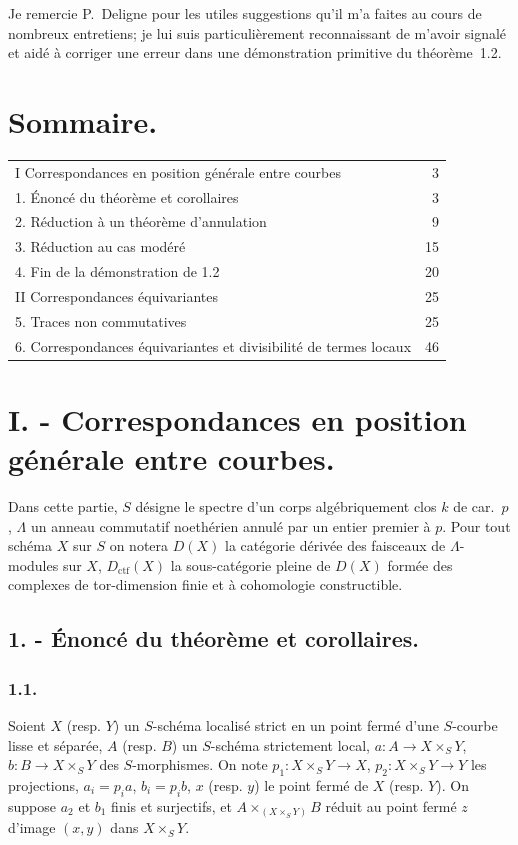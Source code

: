 \documentclass[11pt]{article}
\providecommand{\ctf}{\mathrm{ctf}}
\begin{document}
Je remercie P.~Deligne pour les utiles suggestions qu'il m'a faites au cours de nombreux entretiens; je lui suis particulièrement reconnaissant de m'avoir signalé et aidé à corriger une erreur dans une démonstration primitive du théorème~1.2.

\section*{Sommaire.}
\begin{tabular}{@{}p{}r@{}}
I Correspondances en position générale entre courbes & 3\\
1. Énoncé du théorème et corollaires & 3\\
2. Réduction à un théorème d'annulation & 9\\
3. Réduction au cas modéré & 15\\
4. Fin de la démonstration de 1.2 & 20\\
II Correspondances équivariantes & 25\\
5. Traces non commutatives & 25\\
6. Correspondances équivariantes et divisibilité de termes locaux & 46
\end{tabular}

\section*{I. - Correspondances en position générale entre courbes.}

Dans cette partie, $S$ désigne le spectre d'un corps algébriquement clos $k$ de car.~$p$, $\Lambda$ un anneau commutatif noethérien annulé par un entier premier à $p$. Pour tout schéma $X$ sur $S$ on notera $D(X)$ la catégorie dérivée des faisceaux de $\Lambda$-modules sur $X$, $D_{\ctf}(X)$ la sous-catégorie pleine de $D(X)$ formée des complexes de tor-dimension finie et à cohomologie constructible.

\subsection*{1. - Énoncé du théorème et corollaires.}

\subsubsection*{1.1.}
Soient $X$ (resp. $Y$) un $S$-schéma localisé strict en un point fermé d'une $S$-courbe lisse et séparée, $A$ (resp. $B$) un $S$-schéma strictement local, $a:A\longrightarrow X\times_S Y$, $b:B\longrightarrow X\times_S Y$ des $S$-morphismes. On note $p_1:X\times_S Y\to X$, $p_2:X\times_S Y\to Y$ les projections, $a_i=p_i a$, $b_i=p_i b$, $x$ (resp. $y$) le point fermé de $X$ (resp. $Y$). On suppose $a_2$ et $b_1$ finis et surjectifs, et $A\times_{(X\times_S Y)}B$ réduit au point fermé $z$ d'image $(x,y)$ dans $X\times_S Y$.
\end{document}
